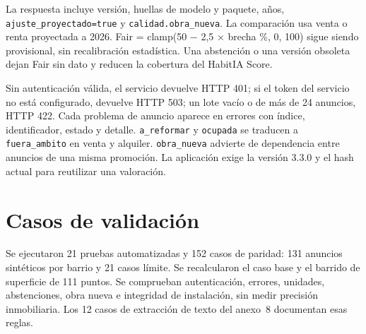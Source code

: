 \documentclass[11pt,a4paper]{article}
\newcounter{anexo}
\begin{document}
La respuesta incluye versión, huellas de modelo y paquete, años, \texttt{ajuste\_proyectado=true} y \texttt{calidad.obra\_nueva}. La comparación usa venta o renta proyectada a 2026. Fair = clamp(50 − 2,5 × brecha \%, 0, 100) sigue siendo provisional, sin recalibración estadística. Una abstención o una versión obsoleta dejan Fair sin dato y reducen la cobertura del HabitIA Score.

Sin autenticación válida, el servicio devuelve HTTP 401; si el token del servicio no está configurado, devuelve HTTP 503; un lote vacío o de más de 24 anuncios, HTTP 422. Cada problema de anuncio aparece en errores con índice, identificador, estado y detalle. \texttt{a\_reformar} y \texttt{ocupada} se traducen a \texttt{fuera\_ambito} en venta y alquiler. \texttt{obra\_nueva} advierte de dependencia entre anuncios de una misma promoción. La aplicación exige la versión 3.3.0 y el hash actual para reutilizar una valoración.

\clearpage{}\label{anx:\theanexo}%
\section*{\theanexo\hspace{0.6em}Casos de validación}

Se ejecutaron 21 pruebas automatizadas y 152 casos de paridad: 131 anuncios sintéticos por barrio y 21 casos límite. Se recalcularon el caso base y el barrido de superficie de 111 puntos. Se comprueban autenticación, errores, unidades, abstenciones, obra nueva e integridad de instalación, sin medir precisión inmobiliaria. Los 12 casos de extracción de texto del anexo~8 documentan esas reglas.
\end{document}
